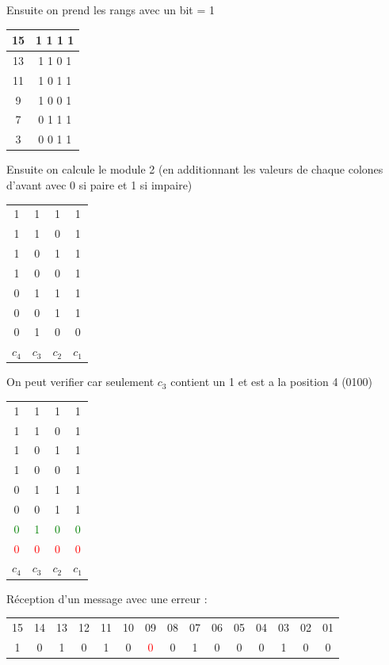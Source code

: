 				Ensuite on prend les rangs avec un bit = 1
				
				\begin{tabular}{c|c}
				15 & 1 1 1 1\\\hline
				13 & 1 1 0 1\\\hline
				11 & 1 0 1 1\\\hline
				9  & 1 0 0 1\\\hline
				7  & 0 1 1 1\\\hline
				3  & 0 0 1 1
				
				\end{tabular}
				
				Ensuite on calcule le module 2 (en additionnant les valeurs de chaque colones d'avant avec 0 si paire et 1 si impaire)
				
				\begin{tabular}{cccc}
				1 & 1 & 1 & 1\\
				1 & 1 & 0 & 1\\
				1 & 0 & 1 & 1\\
				1 & 0 & 0 & 1\\
				0 & 1 & 1 & 1\\
				0 & 0 & 1 & 1\\ \hline
				0 & 1 & 0 & 0\\
				$c_4$ & $c_3$ & $c_2$ & $c_1$
				
				\end{tabular}
				
				On peut verifier  car seulement $c_3$ contient un 1 et est a la position 4 (0100)
				
				\begin{tabular}{cccc}
				1 & 1 & 1 & 1\\
				1 & 1 & 0 & 1\\
				1 & 0 & 1 & 1\\
				1 & 0 & 0 & 1\\
				0 & 1 & 1 & 1\\
				0 & 0 & 1 & 1\\ 
				\textcolor{green}{0} & \textcolor{green}{1} & \textcolor{green}{0} & \textcolor{green}{0}\\\hline
				\textcolor{red}{0} & \textcolor{red}{0} & \textcolor{red}{0} & \textcolor{red}{0}\\
				$c_4$ & $c_3$ & $c_2$ & $c_1$
				
				\end{tabular}
				
				Réception d'un message avec une erreur :
				
				\begin{tabular}{ccccccccccccccc}
					15 & 14 & 13 & 12 & 11 & 10 & 09 & 08 & 07 & 06 & 05 & 04 & 03 & 02 & 01\\
					1 & 0 & 1 & 0 & 1 & 0 & \textcolor{red}{0} & 0 & 1 & 0 & 0 & 0 & 1 & 0 & 0 
				\end{tabular}
				
